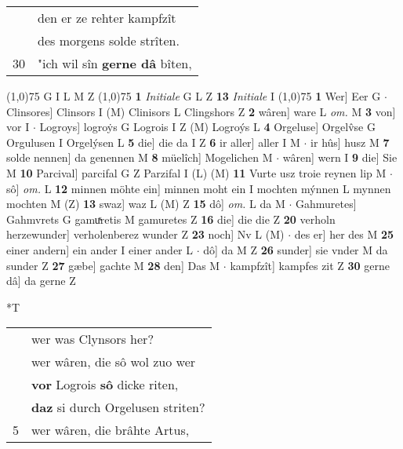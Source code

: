 \documentclass[8pt,a4paper,notitlepage]{article}
\begin{document}
\begin{table}[ht]
\begin{minipage}[t]{0.5\linewidth}
\begin{tabular}{rl}
 & den er ze rehter kampfzît\\ 
 & des morgens solde strîten.\\ 
30 & "ich wil sîn \textbf{gerne dâ} bîten,\\ 
\end{tabular}
\scriptsize
\line(1,0){75} \newline
G I L M Z \newline
\line(1,0){75} \newline
\textbf{1} \textit{Initiale} G L Z  \textbf{13} \textit{Initiale} I  \newline
\line(1,0){75} \newline
\textbf{1} Wer] Eer G  $\cdot$ Clinsores] Clinsors I (M) Clinisors L Clingshors Z \textbf{2} wâren] ware L \textit{om.} M \textbf{3} von] vor I  $\cdot$ Logroys] logroẏs G Logrois I Z (M) Logroýs L \textbf{4} Orgeluse] Orgelv̂se G Orgulusen I Orgelýsen L \textbf{5} die] die da I Z \textbf{6} ir aller] aller I M  $\cdot$ ir hûs] husz M \textbf{7} solde nennen] da genennen M \textbf{8} müelîch] Mogelichen M  $\cdot$ wâren] wern I \textbf{9} die] Sie M \textbf{10} Parcival] parcifal G Z Parzifal I (L) (M) \textbf{11} Vurte usz troie reynen lip M  $\cdot$ sô] \textit{om.} L \textbf{12} minnen möhte ein] minnen moht ein I mochten mýnnen L mynnen mochten M (Z) \textbf{13} swaz] waz L (M) Z \textbf{15} dô] \textit{om.} L da M  $\cdot$ Gahmuretes] Gahmvrets G gamuͯretis M gamuretes Z \textbf{16} die] die die Z \textbf{20} verholn herzewunder] verholenberez wunder Z \textbf{23} noch] Nv L (M)  $\cdot$ des er] her des M \textbf{25} einer andern] ein ander I einer ander L  $\cdot$ dô] da M Z \textbf{26} sunder] sie vnder M da sunder Z \textbf{27} gæbe] gachte M \textbf{28} den] Das M  $\cdot$ kampfzît] kampfes zit Z \textbf{30} gerne dâ] da gerne Z \newline
\end{minipage}
\hspace{0.5cm}
\begin{minipage}[t]{0.5\linewidth}
\small
\begin{center}*T
\end{center}
\begin{tabular}{rl}
 & wer was Clynsors her?\\ 
 & wer wâren, die sô wol zuo wer\\ 
 & \textbf{vor} Logrois \textbf{sô} dicke riten,\\ 
 & \textbf{daz} si durch Orgelusen striten?\\ 
5 & wer wâren, die brâhte Artus,\\ 

\end{tabular}
\end{minipage}
\end{table}
\end{document}
